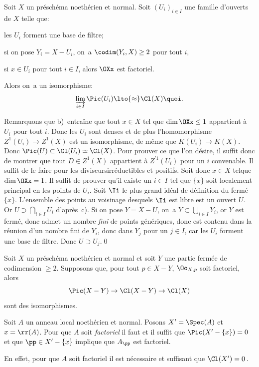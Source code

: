 \begin{propositionblah} \label{XI.3.7.1}
Soit $X$ un pr\'esch\'ema noeth\'erien et normal. Soit $(U_i)_{i\in I}$ une famille d'ouverts de $X$ telle que:
\begin{enumeratea}
\item
les $U_i$ forment une base de filtre;
\item
si on pose $Y_i=X-U_i$, on~a $\codim(Y_i, X)\geq 2$ pour tout $i$,
\item
si $x\in U_i$ pour tout $i\in I$, alors $\OXx$ est factoriel.
\end{enumeratea}
\noindent
Alors on~a un isomorphisme:
\[
\varinjlim_{i\in I}\Pic(U_i)\lto{\approx}\Cl(X){\quoi}.
\]
\end{propositionblah} Remarquons que b)~entra\^ine que tout $x\in X$ tel que $\dim\OXx\leq 1$ appartient \`a $U_i$ pour tout $i$. Donc les $U_i$ sont denses et de plus l'homomorphisme $Z^1(U_i)\to Z^1(X)$ est un isomorphisme, de m\^eme que $K(U_i)\to K(X)$. Donc $\Pic(U)\subset \Cl(U_i) \simeq \Cl(X)$. Pour prouver ce que l'on d\'esire, il suffit donc de montrer que tout $D\in Z^1(X)$ appartient \`a $Z^{\prime1}(U_i)$ pour un $i$ convenable. Il suffit de le faire pour les \og diviseurs\fg irr\'eductibles et positifs. Soit donc $x\in X$ tel\pageoriginaled que $\dim\OXx=1$. Il suffit de prouver qu'il existe un $i\in I$ tel que $\overline{\{x\}}$ soit localement principal en les points de $U_i$. Soit $\Ii$ le plus grand id\'eal de d\'efinition du ferm\'e $\overline{\{x\}}$. L'ensemble des points au voisinage desquels $\Ii$ est libre est un ouvert $U$. Or $U\supset \bigcap_{i\in I}U_i$ d'apr\`es~c). Si on pose $Y=X-U$, on~a $Y\subset \bigcup_{i\in I}Y_i$, or $Y$ est ferm\'e, donc admet un nombre \emph{fini} de points g\'en\'eriques, donc est contenu dans la r\'eunion d'un nombre fini de $Y_i$, donc dans $Y_j$ pour un $j\in I$, car les $U_i$ forment une base de filtre. Donc $U\supset U_j$.\qed

\begin{corollaire} \label{XI.3.8}
Soit $X$ un pr\'esch\'ema noeth\'erien et normal et soit $Y$ une partie ferm\'ee de codimension $\geq 2$. Supposons que, pour tout $p\in X-Y$, $\Oo_{X, p}$ soit factoriel, alors
\[
\Pic(X-Y)\to\Cl(X-Y)\to\Cl(X)
\]
sont des isomorphismes.
\end{corollaire}

\begin{corollaire} \label{XI.3.9}
Soit $A$ un anneau local noeth\'erien et normal. Posons $X'=\Spec(A)$ et $x = \rr(A)$. Pour que $A$ soit \emph{factoriel} il faut et il suffit que $\Pic(X'-\{x\})=0$ et que $\pp\in X'-\{x\}$ implique que $A_\pp$ est factoriel.
\end{corollaire}
En effet, pour que $A$ soit factoriel il est n\'ecessaire et suffisant que $\Cl(X')=0$\,.

